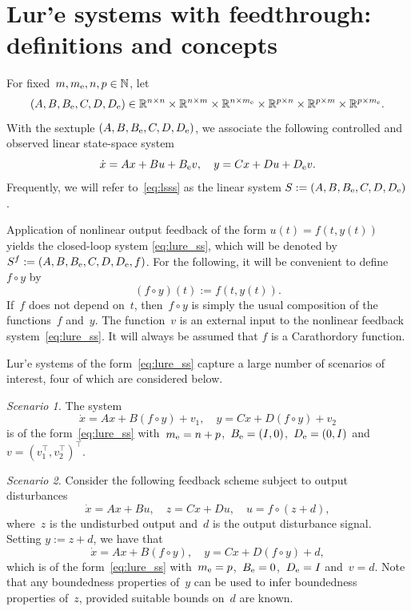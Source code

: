 \documentclass[a4paper,11pt]{article}
\newcommand{\mR}{\mathbb R}
\newcommand{\N}{\mathbb N}
\numberwithin{equation}{section}
\numberwithin{figure}{section}
\numberwithin{table}{section}
\begin{document}
\section{Lur'e systems with feedthrough: definitions and concepts}\label{sec:feedthrough}
%
For fixed~$m,m_{\rm e},n,p\in \N$, let
 \[
(A,B,B_{\rm e},C,D,D_{\rm e})\in \mR^{n\times n}\times\mR^{n\times m}\times
 \mR^{n \times m_{\rm e}} \times \mR^{p\times n}
 \times \mR^{p\times m}\times \mR^{p\times m_{\rm e}}.
 \]
With the sextuple $(A,B,B_{\rm e},C,D,D_{\rm e})$, we associate the
following controlled and observed linear state-space system
 \begin{equation}\label{eq:lsss}
  \dot x = Ax + Bu + B_{\rm e}v, \quad y= Cx+Du + D_{\rm e}v.
 \end{equation}
Frequently, we will refer to~\eqref{eq:lsss} as the linear system $S:=(A,B,B_{\rm e},C,D,D_{\rm e})$.

Application of nonlinear output feedback of the form $u(t)=f(t,y(t))$ yields the closed-loop system \eqref{eq:lure_ss}, which will be denoted by $S^f:=(A,B,B_{\rm e},C,D,D_{\rm e},f)$.
For the following, it will be convenient to define $f\circ y$ by
\[
(f\circ y)(t):=f(t,y(t)).
\]
If~$f$ does not depend on~$t$, then~$f\circ y$ is simply the usual composition of the functions~$f$ and~$y$. The function~$v$ is an external input to the nonlinear feedback system~\eqref{eq:lure_ss}. It will always be assumed that $f$ is a Carathordory function.

Lur'e systems of the form~\eqref{eq:lure_ss} capture a large number of scenarios of interest, four of which are considered below.

{\it Scenario 1.} The system
\[
\dot x = Ax + B(f\circ y) + v_1, \quad y= Cx+D(f\circ y) + v_2
\]
is of the form~\eqref{eq:lure_ss} with~$m_{\rm e}=n+p$,~$B_{\rm e}=(I,0)$,~$D_{\rm e}=(0,I)$
and $v=(v_1^\top,v_2^\top)^\top$.

{\it Scenario 2.} Consider the following feedback scheme subject to output disturbances
\[
\dot x = Ax + Bu, \quad z= Cx+Du,\quad u=f\circ (z+d),
\]
where~$z$ is the undisturbed output and~$d$ is the output disturbance signal. Setting
$y:=z+d$, we have that
\[
\dot x = Ax + B(f\circ y), \quad y= Cx+D(f\circ y)+d,
\]
which is of the form~\eqref{eq:lure_ss} with~$m_{\rm e}=p$,~$B_{\rm e}=0$,~$D_{\rm e}=I$
and~$v=d$. Note that any boundedness properties of~$y$ can be used to infer boundedness properties of~$z$, provided suitable bounds on~$d$ are known.
\end{document}
